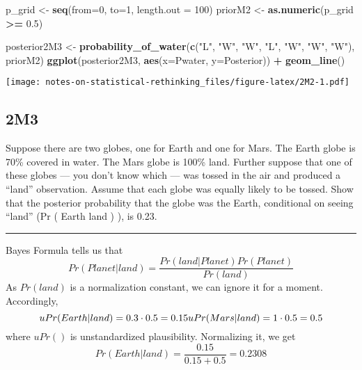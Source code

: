 \documentclass[
]{book}
\newenvironment{Shaded}{\begin{snugshade}}{\end{snugshade}}
\newcommand{\DataTypeTok}[1]{\textcolor[rgb]{0.13,0.29,0.53}{#1}}
\newcommand{\DecValTok}[1]{\textcolor[rgb]{0.00,0.00,0.81}{#1}}
\newcommand{\FloatTok}[1]{\textcolor[rgb]{0.00,0.00,0.81}{#1}}
\newcommand{\KeywordTok}[1]{\textcolor[rgb]{0.13,0.29,0.53}{\textbf{#1}}}
\newcommand{\NormalTok}[1]{#1}
\newcommand{\OperatorTok}[1]{\textcolor[rgb]{0.81,0.36,0.00}{\textbf{#1}}}
\newcommand{\StringTok}[1]{\textcolor[rgb]{0.31,0.60,0.02}{#1}}
\begin{document}
\begin{Shaded}
\begin{Highlighting}[]
\NormalTok{p\_grid \textless{}{-}}\StringTok{ }\KeywordTok{seq}\NormalTok{(}\DataTypeTok{from=}\DecValTok{0}\NormalTok{, }\DataTypeTok{to=}\DecValTok{1}\NormalTok{, }\DataTypeTok{length.out =} \DecValTok{100}\NormalTok{)}
\NormalTok{priorM2 \textless{}{-}}\StringTok{ }\KeywordTok{as.numeric}\NormalTok{(p\_grid }\OperatorTok{\textgreater{}=}\StringTok{ }\FloatTok{0.5}\NormalTok{)}

\NormalTok{posterior2M3 \textless{}{-}}\StringTok{ }\KeywordTok{probability\_of\_water}\NormalTok{(}\KeywordTok{c}\NormalTok{(}\StringTok{"L"}\NormalTok{, }\StringTok{"W"}\NormalTok{, }\StringTok{"W"}\NormalTok{, }\StringTok{"L"}\NormalTok{, }\StringTok{"W"}\NormalTok{, }\StringTok{"W"}\NormalTok{, }\StringTok{"W"}\NormalTok{), priorM2)}
\KeywordTok{ggplot}\NormalTok{(posterior2M3, }\KeywordTok{aes}\NormalTok{(}\DataTypeTok{x=}\NormalTok{Pwater, }\DataTypeTok{y=}\NormalTok{Posterior)) }\OperatorTok{+}\StringTok{ }
\StringTok{  }\KeywordTok{geom\_line}\NormalTok{() }
\end{Highlighting}
\end{Shaded}

\texttt{[image: notes-on-statistical-rethinking\_files/figure-latex/2M2-1.pdf]}

\hypertarget{m3}{%
\subsection*{2M3}\label{m3}}

Suppose there are two globes, one for Earth and one for Mars. The Earth globe is 70\% covered in water. The Mars globe is 100\% land. Further suppose that one of these globes --- you don't know which --- was tossed in the air and produced a ``land'' observation. Assume that each globe was equally likely to be tossed. Show that the posterior probability that the globe was the Earth, conditional on seeing ``land'' (Pr ( Earth \textbar{} land ) ), is 0.23.

\begin{center}\rule{0.5\linewidth}{0.5pt}\end{center}

Bayes Formula tells us that
\[Pr(Planet | land) = \frac{Pr(land | Planet) Pr(Planet)}{Pr(land)}\]
As \(Pr(land)\) is a normalization constant, we can ignore it for a moment. Accordingly,
\[uPr(Earth | land) = 0.3 \cdot 0.5 = 0.15\\
uPr(Mars | land) = 1 \cdot 0.5 = 0.5\]
where \(uPr()\) is unstandardized plausibility. Normalizing it, we get
\[Pr(Earth | land) = \frac{0.15}{0.15 + 0.5} = 0.2308\]
\end{document}

